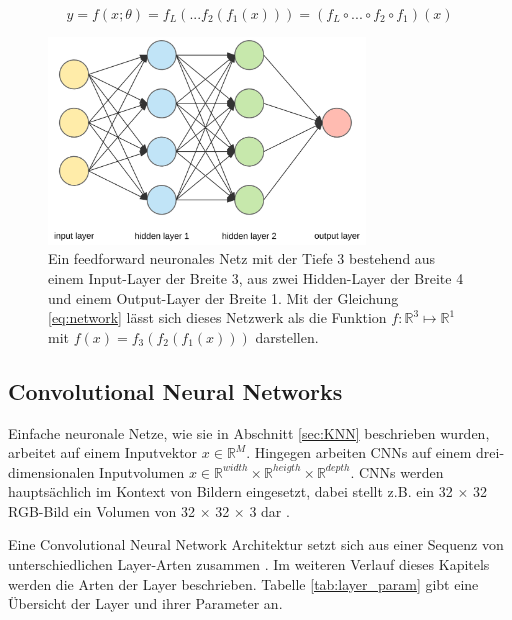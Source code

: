 \begin{equation}
\label{eq:network}
y = f(x; \theta)=  f_L(...f_2(f_1(x))) = (f_L \circ ... \circ f_2 \circ f_1)(x)
\end{equation}

\vspace*{1.5cm}

\begin{figure}[H]
	\centering
	\includegraphics[width=0.75\textwidth]{images/neural_net.png}
	\caption{Ein feedforward neuronales Netz mit der Tiefe 3 bestehend aus einem Input-Layer der Breite 3, aus zwei Hidden-Layer der Breite 4 und einem Output-Layer der Breite 1. Mit der Gleichung \ref{eq:network}  lässt sich dieses Netzwerk als die Funktion $f :  \mathbb{R}^{3} \mapsto \mathbb{R}^{1}$ mit $f(x)=f_3(f_2(f_1(x)))$ darstellen. }
	\label{fig:neural_net}
\end{figure}
\vspace*{1.5cm}

\subsection{Convolutional Neural Networks}

Einfache neuronale Netze, wie sie in Abschnitt \ref{sec:KNN} beschrieben wurden, arbeitet auf einem Inputvektor $x \in \mathbb{R}^{M}$. Hingegen arbeiten CNNs auf einem drei-dimensionalen Inputvolumen $x \in \mathbb{R}^{width} \times \mathbb{R}^{heigth} \times \mathbb{R}^{depth}$. CNNs werden hauptsächlich im Kontext von Bildern eingesetzt, dabei stellt z.B. ein 32 $\times$ 32 RGB-Bild ein Volumen von 32 $\times$ 32 $\times$ 3 dar \cite{CS231nConvolutionalNeurala}.

Eine Convolutional Neural Network Architektur setzt sich aus einer Sequenz von unterschiedlichen Layer-Arten zusammen \cite{CS231nConvolutionalNeurala}. Im weiteren Verlauf dieses Kapitels werden die Arten der Layer beschrieben. Tabelle \ref{tab:layer_param} gibt eine Übersicht der Layer und ihrer Parameter an.

